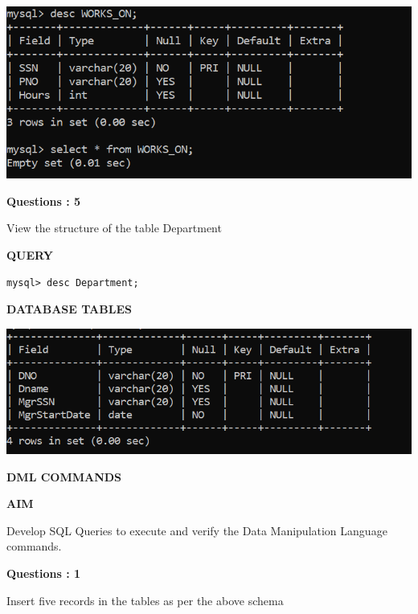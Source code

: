 \documentclass[a4paper,12pt]{report}
\begin{document}
\includegraphics[scale=1]{truncate.png}
\begin{flushleft}
    \textbf{Questions : 5}
\end{flushleft}
View the structure of the table Department
\begin{flushleft}
		\textbf{QUERY }
	\end{flushleft}
\begin{verbatim}
mysql> desc Department;

\end{verbatim}

\begin{flushleft}
		\textbf{DATABASE TABLES}
\end{flushleft} 

\includegraphics[scale=1]{viewdept.png}

\newpage
\begin{center}
		\large\textbf{DML COMMANDS}
	\end{center}
	
	\begin{flushleft}
		\textbf{AIM }
	\end{flushleft} 
	   Develop SQL Queries to execute and verify the Data Manipulation Language commands.
\begin{flushleft}
    \textbf{Questions : 1}
\end{flushleft}
 Insert five records in the tables as per the above schema
	
\end{document}
